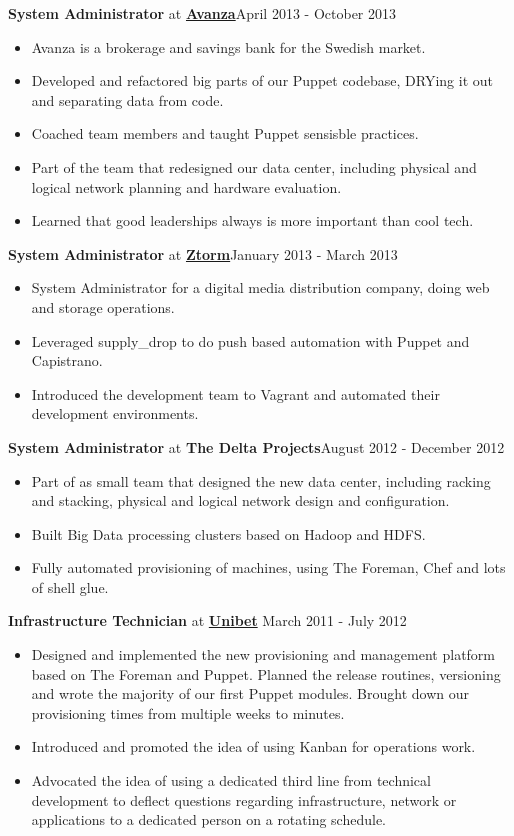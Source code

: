 \documentclass[8pt]{article}
\newenvironment{outerlist}[1][\enskip\textbullet]%
        {\begin{itemize}[#1]}{\end{itemize}%
         \vspace{-.6\baselineskip}}
\newcommand{\blankline}{\quad\pagebreak[2]}
\begin{document}
\textbf{System Administrator} at \href{http://www.avanza.se}{\textbf{Avanza}}\hfill {April 2013 - October 2013}
\begin{outerlist}
\item[] Avanza is a brokerage and savings bank for the Swedish market.

	\item Developed and refactored big parts of our Puppet codebase, DRYing it out and separating data from code.
	\item Coached team members and taught Puppet sensisble practices.
	\item Part of the team that redesigned our data center, including physical and logical network planning and hardware evaluation.
	\item Learned that good leaderships always is more important than cool tech.

\end{outerlist}
\blankline

\textbf{System Administrator} at \href{http://www.ztorm.com}{\textbf{Ztorm}}\hfill {January 2013 - March 2013}
\begin{outerlist}
\item[] System Administrator for a digital media distribution company, doing web and storage operations. 

	\item Leveraged supply\_drop to do push based automation with Puppet and Capistrano.
	\item Introduced the development team to Vagrant and automated their development environments.
\end{outerlist}
\blankline

\textbf{System Administrator} at {\textbf{The Delta Projects}}\hfill {August 2012 - December 2012}
\begin{outerlist}
	\item Part of as small team that designed the new data center, including racking and stacking, physical and logical network design and configuration.
	\item Built Big Data processing clusters based on Hadoop and HDFS.
	\item Fully automated provisioning of machines, using The Foreman, Chef and lots of shell glue.
\end{outerlist}
\blankline

\textbf{Infrastructure Technician} at \href{http://www.unibet.com}{\textbf{Unibet}}  \hfill {March 2011 - July 2012}
\begin{outerlist}
	 \item Designed and implemented the new provisioning and management platform based on The Foreman and Puppet. Planned the release routines, versioning and wrote the majority of our first Puppet modules. Brought down our provisioning times from multiple weeks to minutes.
	\item Introduced and promoted the idea of using Kanban for operations work.
	\item Advocated the idea of using a dedicated third line from technical development to deflect questions regarding infrastructure, network or applications to a dedicated person on a rotating schedule.
\end{outerlist}
\blankline
\end{document}
